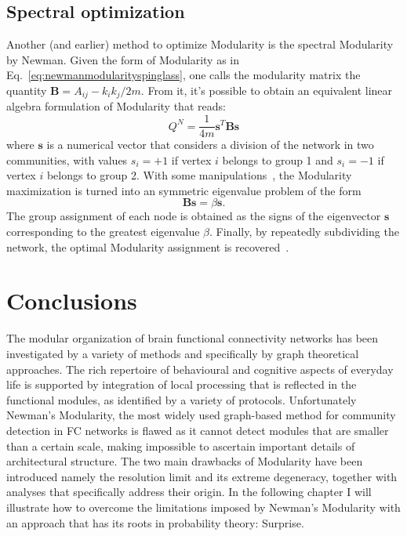 \subsection{Spectral optimization}
Another (and earlier) method to optimize Modularity is the spectral Modularity by Newman. Given the form of Modularity as in Eq.~\ref{eq:newmanmodularityspinglass}, one calls the modularity matrix the quantity $\mathbf{B}=A_{ij} - k_i k_j/2m$. From it, it's possible to obtain an equivalent linear algebra formulation of Modularity that reads:
\begin{equation}\label{eq:newman_spectral}
Q^N = \frac{1}{4m} \mathbf{s}^T \mathbf{B} \mathbf{s}
\end{equation}
where $\mathbf{s}$ is a numerical vector that considers a division of the network in two communities, with values $s_i=+1$ if vertex $i$ belongs to group 1 and $s_i=-1$ if vertex $i$ belongs to group 2. With some manipulations~\cite{newman2006,newman2010book}, the Modularity maximization is turned into an symmetric eigenvalue problem of the form
\begin{equation}
\mathbf{B} \mathbf{s} = \beta \mathbf{s}.
\end{equation}
The group assignment of each node is obtained as the signs of the eigenvector $\mathbf{s}$ corresponding to the greatest eigenvalue $\beta$. Finally, by repeatedly subdividing the network, the optimal Modularity assignment is recovered~\cite{newman2006,newman2010book}.

\section{Conclusions}
The modular organization of brain functional connectivity networks has been investigated by a variety of methods and specifically by graph theoretical approaches. The rich repertoire of behavioural and cognitive aspects of everyday life is supported by integration of local processing that is reflected in the functional modules, as identified by a variety of protocols.
Unfortunately Newman's Modularity, the most widely used graph-based method for community detection in FC networks is flawed as it cannot detect modules that are smaller than a certain scale, making impossible to ascertain important details of architectural structure.
The two main drawbacks of Modularity have been introduced namely the resolution limit and its extreme degeneracy, together with analyses that specifically address their origin. In the following chapter I will illustrate how to overcome the limitations imposed by Newman's Modularity with an approach that has its roots in probability theory: Surprise.
